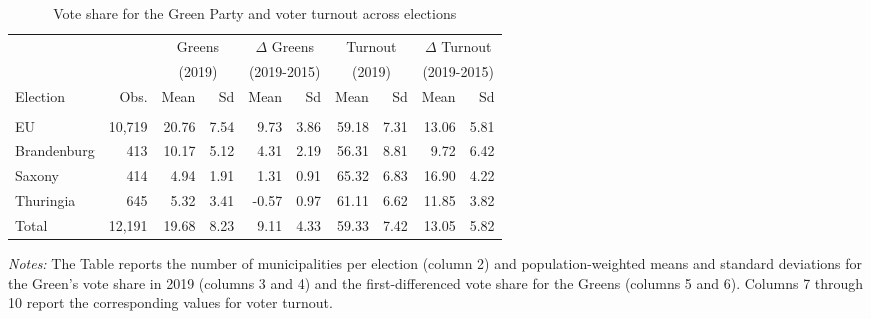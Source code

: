 
	\begin{table}[H]\centering
		\begin{threeparttable}
			\caption{Vote share for the Green Party and voter turnout across elections}
			\label{tab_greta_cons:data_greens_vote_share}
			\begin{tabular}{l*{9}{r}}
				\toprule
				&&\multicolumn{2}{c}{Greens}&\multicolumn{2}{c}{$\Delta$ Greens}&\multicolumn{2}{c}{Turnout}&\multicolumn{2}{c}{$\Delta$ Turnout}\\
				&&\multicolumn{2}{c}{(2019)}&\multicolumn{2}{c}{(2019-2015)}&\multicolumn{2}{c}{(2019)}&\multicolumn{2}{c}{(2019-2015)}\\
				\cmidrule(lr){3-4}\cmidrule(lr){5-6}\cmidrule(lr){7-8}\cmidrule(lr){9-10}
				Election		&	Obs.	&	Mean		&	Sd		&	Mean	& Sd	&	Mean	&	Sd		&	Mean	& Sd		\\
				\midrule\\
				EU				&	10,719	&	20.76		&	7.54	&	9.73	& 3.86	&	59.18	&	7.31	&	13.06	&	5.81	\\
				Brandenburg		&	413		&	10.17		&	5.12	&	4.31	& 2.19	&	56.31	&	8.81	&	9.72	&	6.42	\\
				Saxony			&	414		&	4.94		&	1.91	&	1.31	& 0.91	&	65.32	&	6.83	&	16.90	&	4.22	\\
				Thuringia		&	645		&	5.32		&	3.41	&	-0.57	& 0.97	&	61.11	&	6.62	&	11.85	&	3.82	\\
				\midrule
				Total			&	12,191	&	19.68		&	8.23	&	9.11	& 4.33	&	59.33	&	7.42	&	13.05	&	5.82	\\
				\bottomrule
			\end{tabular}
			\begin{tablenotes} 
				\item \scriptsize \emph{Notes:} The Table reports the number of municipalities per election (column 2) and population-weighted means and standard deviations for the Green's vote share in 2019 (columns 3 and 4) and the first-differenced vote share for the Greens (columns 5 and 6). Columns 7 through 10 report the corresponding values for voter turnout. 
			\end{tablenotes} 
		\end{threeparttable}
	\end{table}

